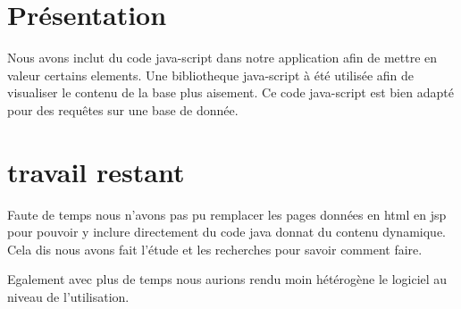 \documentclass[12pt]{article}
\begin{document}
\section{ Présentation}
Nous avons inclut du code java-script dans notre application afin de  mettre en valeur certains elements. Une bibliotheque java-script à été utilisée afin de visualiser le contenu de la base plus aisement. Ce code java-script est bien adapté pour des requêtes sur une base de donnée.


\section{travail restant}

Faute de temps nous n'avons pas pu remplacer les pages données en html en jsp pour pouvoir y inclure directement du code java donnat du contenu dynamique.
Cela dis nous avons fait l'étude et les recherches pour savoir comment faire.

Egalement avec plus de temps nous aurions rendu moin hétérogène le logiciel au niveau de l'utilisation.
\end{document}
